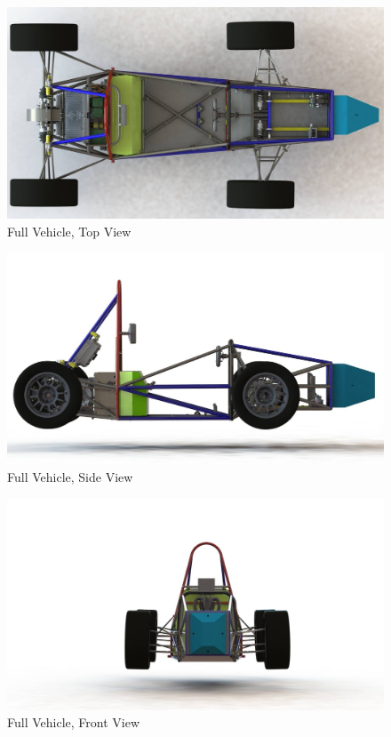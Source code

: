 \documentclass{article}
\begin{document}
 \newpage


\newpage
\newpage
        \begin{figure}[H]
            \centering
            \includegraphics[width = 0.7 \textwidth]{cartopdown}
            \caption{Full Vehicle, Top View}
            \label{cartopdown}
        \end{figure}

        \begin{figure}[H]
            \centering
            \includegraphics[width = 0.7 \textwidth]{carsideview}
            \caption{Full Vehicle, Side View}
            \label{carsideview}
        \end{figure}

        \begin{figure}[H]
            \centering
            \includegraphics[width = 0.7 \textwidth]{carfront}
            \caption{Full Vehicle, Front View}
            \label{carfront}
        \end{figure}
\end{document}
